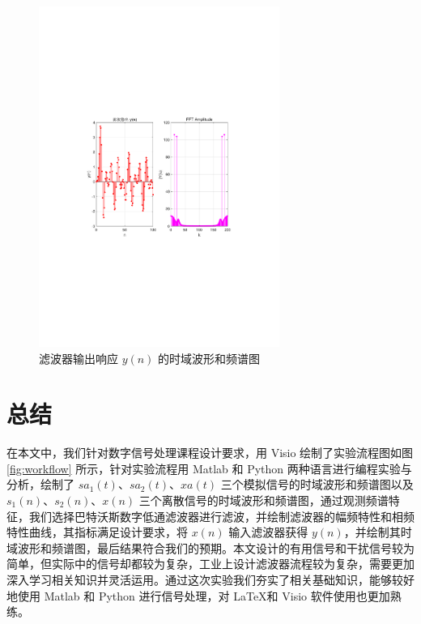 \documentclass[12pt,AutoFakeBold]{article}
\begin{document}
\begin{figure}[htbp]
	\centering
	\includegraphics[width=0.7\textwidth]{figure/yn.pdf}
	\caption{滤波器输出响应 $y(n)$ 的时域波形和频谱图} \label{fig:yn}
\end{figure}

\section{总结}

在本文中，我们针对数字信号处理课程设计要求，用 Visio 绘制了实验流程图如图 \ref{fig:workflow} 所示，针对实验流程用 Matlab 和 Python 两种语言进行编程实验与分析，绘制了 $sa_1(t)$、$sa_2(t)$、$xa(t)$ 三个模拟信号的时域波形和频谱图以及 $s_1(n)$、$s_2(n)$、$x(n)$ 三个离散信号的时域波形和频谱图，通过观测频谱特征，我们选择巴特沃斯数字低通滤波器进行滤波，并绘制滤波器的幅频特性和相频特性曲线，其指标满足设计要求，将 $x(n)$ 输入滤波器获得 $y(n)$，并绘制其时域波形和频谱图，最后结果符合我们的预期。本文设计的有用信号和干扰信号较为简单，但实际中的信号却都较为复杂，工业上设计滤波器流程较为复杂，需要更加深入学习相关知识并灵活运用。通过这次实验我们夯实了相关基础知识，能够较好地使用 Matlab 和 Python 进行信号处理，对 \LaTeX 和 Visio 软件使用也更加熟练。



\end{document}
